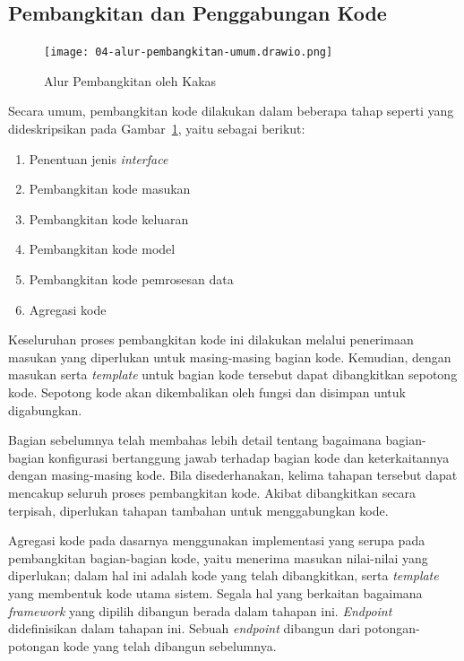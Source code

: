 \subsection{Pembangkitan dan Penggabungan Kode}

\begin{figure}[ht]
  \vspace{\baselineskip}
    \centering
    \texttt{[image: 04-alur-pembangkitan-umum.drawio.png]}
    \caption{Alur Pembangkitan oleh Kakas}\label{fig:04-flowchart-code-generation}
\end{figure}

Secara umum, pembangkitan kode dilakukan dalam beberapa tahap seperti yang dideskripsikan pada Gambar~\ref{fig:04-flowchart-code-generation}, yaitu sebagai berikut:
\begin{enumerate}
    \item Penentuan jenis \textit{interface}
    \item Pembangkitan kode masukan
    \item Pembangkitan kode keluaran
    \item Pembangkitan kode model
    \item Pembangkitan kode pemrosesan data
    \item Agregasi kode
\end{enumerate}

Keseluruhan proses pembangkitan kode ini dilakukan melalui penerimaan masukan yang diperlukan untuk masing-masing bagian kode.
Kemudian, dengan masukan serta \textit{template} untuk bagian kode tersebut dapat dibangkitkan sepotong kode.
Sepotong kode akan dikembalikan oleh fungsi dan disimpan untuk digabungkan. 

Bagian sebelumnya telah membahas lebih detail tentang bagaimana bagian-bagian konfigurasi bertanggung jawab terhadap bagian kode dan keterkaitannya dengan masing-masing kode.
Bila disederhanakan, kelima tahapan tersebut dapat mencakup seluruh proses pembangkitan kode.
Akibat dibangkitkan secara terpisah, diperlukan tahapan tambahan untuk menggabungkan kode.

Agregasi kode pada dasarnya menggunakan implementasi yang serupa pada pembangkitan bagian-bagian kode, yaitu menerima masukan nilai-nilai yang diperlukan; dalam hal ini adalah kode yang telah dibangkitkan, serta \textit{template} yang membentuk kode utama sistem.
Segala hal yang berkaitan bagaimana \textit{framework} yang dipilih dibangun berada dalam tahapan ini.
\textit{Endpoint} didefinisikan dalam tahapan ini.
Sebuah \textit{endpoint} dibangun dari potongan-potongan kode yang telah dibangun sebelumnya.

